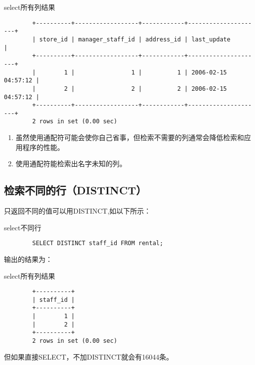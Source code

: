 \documentclass[UTF8]{article}
\begin{document}
\begin{listing}[H]
	\caption{select所有列结果}
	\label{code:resultofselectallcolumns}
	\begin{verbatim}
        +----------+------------------+------------+---------------------+
        | store_id | manager_staff_id | address_id | last_update         |
        +----------+------------------+------------+---------------------+
        |        1 |                1 |          1 | 2006-02-15 04:57:12 |
        |        2 |                2 |          2 | 2006-02-15 04:57:12 |
        +----------+------------------+------------+---------------------+
        2 rows in set (0.00 sec)
\end{verbatim}
\end{listing}
\begin{orangebox}[frametitle={Tips 4.3}]
    \begin{enumerate}
        \item 虽然使用通配符可能会使你自己省事，但检索不需要的列通常会降低检索和应用程序的性能。
        \item 使用通配符能检索出名字未知的列。
    \end{enumerate}
    \end{orangebox}
\subsection{检索不同的行（DISTINCT）}

只返回不同的值可以用DISTINCT,如以下所示：

\begin{listing}[H]
	\caption{select不同行}
	\label{code:selectdifferentrows}
	\begin{verbatim}
        SELECT DISTINCT staff_id FROM rental;
\end{verbatim}
\end{listing}

输出的结果为：

\begin{listing}[H]
	\caption{select所有列结果}
	\label{code:resultofselectdifferent rows}
	\begin{verbatim}
        +----------+
        | staff_id |
        +----------+
        |        1 |
        |        2 |
        +----------+
        2 rows in set (0.00 sec)
\end{verbatim}
\end{listing}

但如果直接SELECT，不加DISTINCT就会有16044条。
\end{document}
